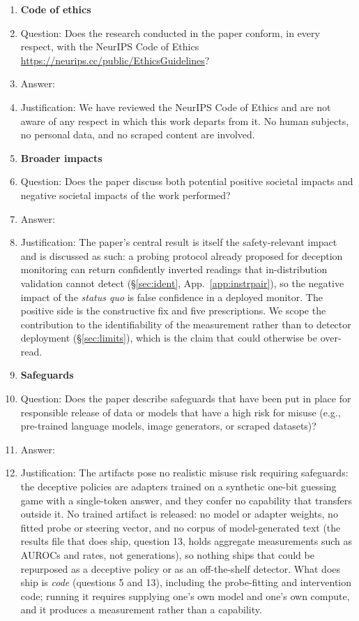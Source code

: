 \begin{enumerate}
\item {\bf Code of ethics}
    \item[] Question: Does the research conducted in the paper conform, in every respect, with the NeurIPS Code of Ethics \url{https://neurips.cc/public/EthicsGuidelines}?
    \item[] Answer: \answerYes{}
    \item[] Justification: We have reviewed the NeurIPS Code of Ethics and are not aware of any respect in which this work departs from it. No human subjects, no personal data, and no scraped content are involved.
\item {\bf Broader impacts}
    \item[] Question: Does the paper discuss both potential positive societal impacts and negative societal impacts of the work performed?
    \item[] Answer: \answerYes{}
    \item[] Justification: The paper's central result is itself the safety-relevant impact and is discussed as such: a probing protocol already proposed for deception monitoring can return confidently inverted readings that in-distribution validation cannot detect (\S\ref{sec:ident}, App.~\ref{app:instrpair}), so the negative impact of the \emph{status quo} is false confidence in a deployed monitor. The positive side is the constructive fix and five prescriptions. We scope the contribution to the identifiability of the measurement rather than to detector deployment (\S\ref{sec:limits}), which is the claim that could otherwise be over-read.
\item {\bf Safeguards}
    \item[] Question: Does the paper describe safeguards that have been put in place for responsible release of data or models that have a high risk for misuse (e.g., pre-trained language models, image generators, or scraped datasets)?
    \item[] Answer: \answerNA{}
    \item[] Justification: The artifacts pose no realistic misuse risk requiring safeguards: the deceptive policies are adapters trained on a synthetic one-bit guessing game with a single-token answer, and they confer no capability that transfers outside it. No trained artifact is released: no model or adapter weights, no fitted probe or steering vector, and no corpus of model-generated text (the results file that does ship, question 13, holds aggregate measurements such as AUROCs and rates, not generations), so nothing ships that could be repurposed as a deceptive policy or as an off-the-shelf detector. What does ship is \emph{code} (questions 5 and 13), including the probe-fitting and intervention code; running it requires supplying one's own model and one's own compute, and it produces a measurement rather than a capability.

\end{enumerate}
